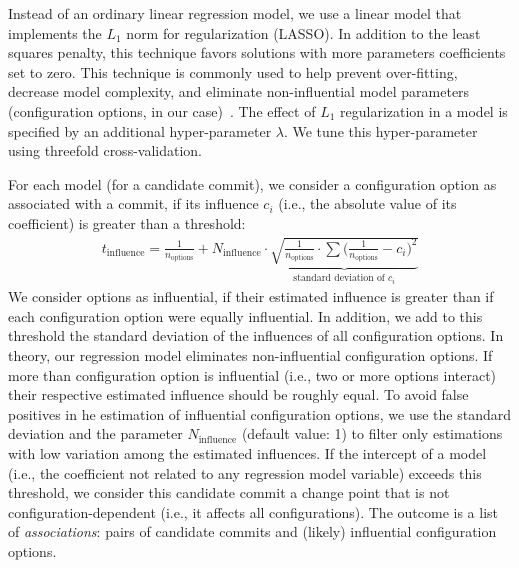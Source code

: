 \documentclass[sigconf, screen]{acmart}
\begin{document}
	Instead of an ordinary linear regression model, we use a linear model that implements the $L_1$ norm for regularization (LASSO). In addition to the least squares penalty, this technique favors solutions with more parameters coefficients set to zero.
	This technique is commonly used to help prevent over-fitting, decrease model complexity, and eliminate non-influential model parameters (configuration options, in our case)~\cite{lasso}. The effect of $L_1$ regularization in a model is specified by an additional hyper-parameter $\lambda$. We tune this hyper-parameter using threefold cross-validation.
	
	For each model (for a candidate commit), we consider a configuration option as associated with a commit, if its influence $c_i$ (i.e., the absolute value of its coefficient) is greater than a threshold:%
	\begin{equation}
	\begin{gathered}
	t_\text{influence} = \frac{1}{n_\text{options}} + N_\text{influence} \cdot \underbrace{\sqrt{\frac{1}{n_\text{options}} \cdot \sum \Big(\frac{1}{n_\text{options}} - c_i\Big)^2}}_{\text{standard deviation of } c_i}
	\label{eq:t_influence}
	\end{gathered}
	\end{equation}
	We consider options as influential, if their estimated influence is greater than if each configuration option were equally influential. In addition, we add to this threshold the standard deviation of the influences of all configuration options. In theory, our regression model eliminates non-influential configuration options. If more than configuration option is influential (i.e., two or more options interact) their respective estimated influence should be roughly equal. To avoid false positives in he estimation of influential configuration options, we use the standard deviation and the parameter $N_\text{influence}$ (default value: 1) to filter only estimations with low variation among the estimated influences. If the intercept of a model (i.e., the coefficient not related to any regression model variable) exceeds this threshold, we consider this candidate commit a change point that is not configuration-dependent (i.e., it affects all configurations). The outcome is a list of \emph{associations}: pairs of candidate commits and (likely) influential configuration options. 
	
\end{document}
